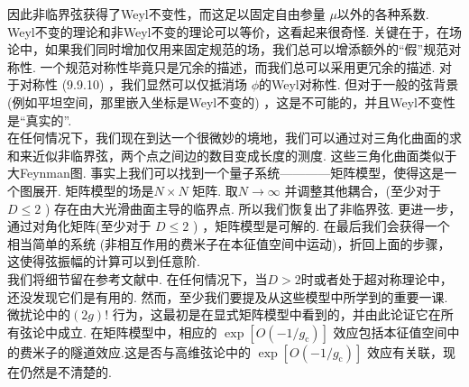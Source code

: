 因此非临界弦获得了Weyl不变性，而这足以固定自由参量 $\mu$以外的各种系数.\\
Weyl不变的理论和非Weyl不变的理论可以等价，这看起来很奇怪. 关键在于，在场论中，如果我们同时增加仅用来固定规范的场，我们总可以增添额外的“假”规范对称性. 一个规范对称性毕竟只是冗余的描述，而我们总可以采用更冗余的描述. 对于对称性 (9.9.10) ，我们显然可以仅抵消场 $\phi$的Weyl对称性. 但对于一般的弦背景(例如平坦空间，那里嵌入坐标是Weyl不变的) ，这是不可能的，并且Weyl不变性是“真实的”.\\
在任何情况下，我们现在到达一个很微妙的境地，我们可以通过对三角化曲面的求和来近似非临界弦，两个点之间边的数目变成长度的测度. 这些三角化曲面类似于大Feynman图. 事实上我们可以找到一个量子系统————矩阵模型，使得这是一个图展开. 矩阵模型的场是$N \times N$ 矩阵. 取$N \rightarrow \infty$ 并调整其他耦合，(至少对于 $D \leq 2$ ) 存在由大光滑曲面主导的临界点. 所以我们恢复出了非临界弦. 更进一步，通过对角化矩阵(至少对于 $D \leq 2$ ) ，矩阵模型是可解的. 在最后我们会获得一个相当简单的系统 (非相互作用的费米子在本征值空间中运动)，折回上面的步骤， 这使得弦振幅的计算可以到任意阶.\\
我们将细节留在参考文献中. 在任何情况下，当$D>2$时或者处于超对称理论中，还没发现它们是有用的. 然而，至少我们要提及从这些模型中所学到的重要一课. 微扰论中的$(2 g) !$ 行为，这最初是在显式矩阵模型中看到的，并由此论证它在所有弦论中成立. 在矩阵模型中，相应的 $\exp \left[O\left(-1 / g_{\mathrm{c}}\right)\right]$ 效应包括本征值空间中的费米子的隧道效应.这是否与高维弦论中的 $\exp \left[O\left(-1 / g_{\mathrm{c}}\right)\right]$ 效应有关联，现在仍然是不清楚的.
